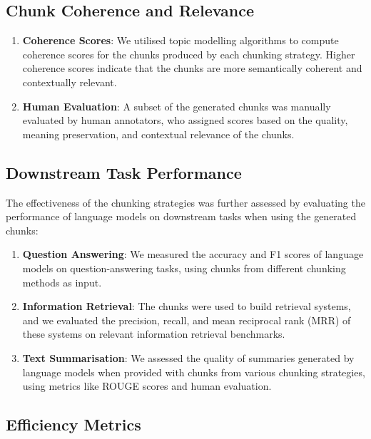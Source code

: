 \documentclass[
  letterpaper,
  DIV=11,
  numbers=noendperiod]{scrartcl}
\begin{document}
\subsection{Chunk Coherence and
Relevance}\label{chunk-coherence-and-relevance}

\begin{enumerate}
\def\labelenumi{\arabic{enumi}.}
\item
  \textbf{Coherence Scores}: We utilised topic modelling algorithms to
  compute coherence scores for the chunks produced by each chunking
  strategy. Higher coherence scores indicate that the chunks are more
  semantically coherent and contextually relevant.
\item
  \textbf{Human Evaluation}: A subset of the generated chunks was
  manually evaluated by human annotators, who assigned scores based on
  the quality, meaning preservation, and contextual relevance of the
  chunks.
\end{enumerate}

\subsection{Downstream Task
Performance}\label{downstream-task-performance}

The effectiveness of the chunking strategies was further assessed by
evaluating the performance of language models on downstream tasks when
using the generated chunks:

\begin{enumerate}
\def\labelenumi{\arabic{enumi}.}
\item
  \textbf{Question Answering}: We measured the accuracy and F1 scores of
  language models on question-answering tasks, using chunks from
  different chunking methods as input.
\item
  \textbf{Information Retrieval}: The chunks were used to build
  retrieval systems, and we evaluated the precision, recall, and mean
  reciprocal rank (MRR) of these systems on relevant information
  retrieval benchmarks.
\item
  \textbf{Text Summarisation}: We assessed the quality of summaries
  generated by language models when provided with chunks from various
  chunking strategies, using metrics like ROUGE scores and human
  evaluation.
\end{enumerate}

\subsection{Efficiency Metrics}\label{efficiency-metrics}
\end{document}
